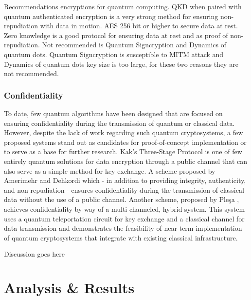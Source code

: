 \documentclass[sigconf]{acmart}
\begin{document}
Recommendations encryptions for quantum computing. QKD when paired with quantum authenticated encryption is a very strong method for ensuring non-repudiation with data in motion. AES 256 bit or higher to secure data at rest. Zero knowledge is a good protocol for ensuring data at rest and as proof of non-repudiation. Not recommended is Quantum Signcryption and Dynamics of quantum dots. Quantum Signcryption is susceptible to MITM attack and Dynamics of quantum dots key size is too large, for these two reasons they are not recommended.

\subsubsection{Confidentiality} %
To date, few quantum algorithms have been designed that are focused on ensuring confidentiality during the transmission of quantum or classical data. However, despite the lack of work regarding such quantum cryptosystems, a few proposed systems stand out as candidates for proof-of-concept implementation or to serve as a base for further research. Kak’s Three-Stage Protocol \cite{kak_three-stage_2006} is one of few entirely quantum solutions for data encryption through a public channel that can also serve as a simple method for key exchange. A scheme proposed by Amerimehr and Dehkordi\cite{amerimehr_quantum_2018} which - in addition to providing integrity, authenticity, and non-repudiation - ensures confidentiality during the transmission of classical data without the use of a public channel. Another scheme, proposed by Pleşa \cite{plesa_hybrid_2017}, achieves confidentiality by way of a multi-channeled, hybrid system. This system uses a quantum teleportation circuit for key exchange and a classical channel for data transmission and demonstrates the feasibility of near-term implementation of quantum cryptosystems that integrate with existing classical infrastructure.

Discussion goes here


\section{Analysis \& Results} %
\end{document}
